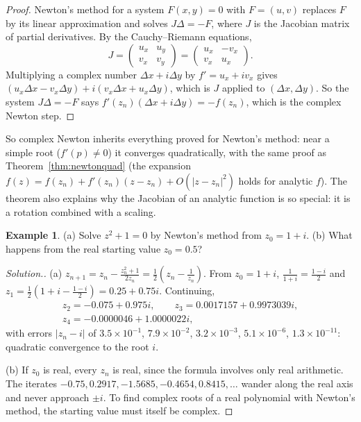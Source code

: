 \documentclass[11pt,a4paper]{article}
\numberwithin{equation}{section}
\theoremstyle{definition}
\newtheorem{exa}[thm]{Example}
\newenvironment{solution}
  {\renewcommand{\qedsymbol}{}\begin{proof}[\textit{Solution}.]}
  {\end{proof}}
\begin{document}
\begin{proof}
Newton's method for a system $F(x,y) = 0$ with $F = (u,v)$ replaces $F$ by its linear approximation and solves $J\Delta = -F$, where $J$
is the Jacobian matrix of partial derivatives. By the Cauchy--Riemann equations,
$$J = \begin{pmatrix}u_x & u_y\\ v_x & v_y\end{pmatrix} = \begin{pmatrix}u_x & -v_x\\ v_x & u_x\end{pmatrix} .$$
Multiplying a complex number $\Delta x+i\Delta y$ by $f' = u_x+iv_x$ gives $(u_x\Delta x-v_x\Delta y)+i(v_x\Delta x+u_x\Delta y)$, which is $J$
applied to $(\Delta x,\Delta y)$. So the system $J\Delta = -F$ says $f'(z_n)(\Delta x+i\Delta y) = -f(z_n)$, which is the complex Newton step.
\end{proof}

So complex Newton inherits everything proved for Newton's method: near a simple root ($f'(p)\neq0$) it converges quadratically, with the
same proof as Theorem~\ref{thm:newtonquad} (the expansion $f(z) = f(z_n)+f'(z_n)(z-z_n)+O(|z-z_n|^2)$ holds for analytic $f$). The theorem
also explains why the Jacobian of an analytic function is so special: it is a rotation combined with a scaling.

\begin{exa}
\label{exa:cnewton}
(a) Solve $z^2+1 = 0$ by Newton's method from $z_0 = 1+i$. (b) What happens from the real starting value $z_0 = 0.5$?
\end{exa}

\begin{solution}
(a) $z_{n+1} = z_n-\frac{z_n^2+1}{2z_n} = \frac12\left(z_n-\frac{1}{z_n}\right)$. From $z_0 = 1+i$, $\frac{1}{1+i} = \frac{1-i}{2}$ and
$z_1 = \frac12\left(1+i-\frac{1-i}{2}\right) = 0.25+0.75i$. Continuing,
\begin{gather*}
z_2 = -0.075+0.975i,\qquad z_3 = 0.0017157+0.9973039i,\\
z_4 = -0.0000046+1.0000022i,
\end{gather*}
with errors $|z_n-i|$ of $3.5\times10^{-1}$, $7.9\times10^{-2}$, $3.2\times10^{-3}$, $5.1\times10^{-6}$, $1.3\times10^{-11}$: quadratic
convergence to the root $i$.

(b) If $z_0$ is real, every $z_n$ is real, since the formula involves only real arithmetic. The iterates
$-0.75, 0.2917, -1.5685, -0.4654, 0.8415,\dots$ wander along the real axis and never approach $\pm i$. To find complex roots of a real
polynomial with Newton's method, the starting value must itself be complex.
\end{solution}
\end{document}
